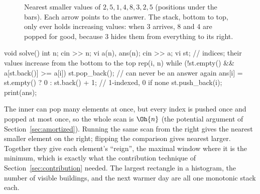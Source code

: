 \begin{figure}[htbp]
\centering
{}
\caption{Nearest smaller values of $2, 5, 1, 4, 8, 3, 2, 5$ (positions under the bars). Each arrow points to the answer.
The stack, bottom to top, only ever holds increasing values: when 3 arrives, 8 and 4 are popped for good, because 3 hides
them from everything to its right.}
\label{fig:monostack}
\end{figure}

\begin{code}
void solve() {
    int n;
    cin >> n;
    vi a(n), ans(n);
    cin >> a;
    vi st;  // indices; their values increase from the bottom to the top
    rep(i, n) {
        while (!st.empty() && a[st.back()] >= a[i])
            st.pop_back();  // can never be an answer again
        ans[i] = st.empty() ? 0 : st.back() + 1;  // 1-indexed, 0 if none
        st.push_back(i);
    }
    print(ans);
}
\end{code}

The inner  can pop many elements at once, but every index is pushed once and popped at most once, so the whole
scan is $\Oh{n}$ (the potential argument of Section~\ref{sec:amortized}). Running the same scan from the right gives the
nearest smaller element on the right; flipping the comparison gives nearest larger. Together they give each element's
``reign'', the maximal window where it is the minimum, which is exactly what the contribution technique of
Section~\ref{sec:contribution} needed. The largest rectangle in a histogram, the number of visible buildings, and the
next warmer day are all one monotonic stack each.

